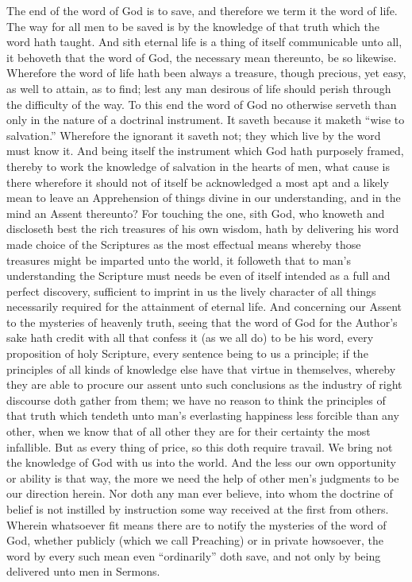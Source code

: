 The end of the word of God is to save, and therefore we term it the word of life. The way for all men to be saved is by the knowledge of that truth which the word hath taught. And sith eternal life is a thing of itself communicable unto all, it behoveth that the word of God, the necessary mean thereunto, be so likewise. Wherefore the word of life hath been always a treasure, though precious, yet easy, as well to attain, as to find; lest any man desirous of life should perish through the difficulty of the way. To this end the word of God no otherwise serveth than only in the nature of a doctrinal instrument. It saveth because it maketh “wise to salvation.” Wherefore the ignorant it saveth not; they which live by the word must know it. And being itself the instrument which God hath purposely framed, thereby to work the knowledge of salvation in the hearts of men, what cause is there wherefore it should not of itself be acknowledged a most apt and a likely mean to leave an Apprehension of things divine in our understanding, and in the mind an Assent thereunto? For touching the one, sith God, who knoweth and discloseth best the rich treasures of his own wisdom, hath by delivering his word made choice of the Scriptures as the most effectual means whereby those treasures might be imparted unto the world, it followeth that to man’s understanding the Scripture must needs be even of itself intended as a full and perfect discovery, sufficient to imprint in us the lively character of all things necessarily required for the attainment of eternal life. And concerning our Assent to the mysteries of heavenly truth,  seeing that the word of God for the Author’s sake hath credit with all that confess it (as we all do) to be his word, every proposition of holy Scripture, every sentence being to us a principle; if the principles of all kinds of knowledge else have that virtue in themselves, whereby they are able to procure our assent unto such conclusions as the industry of right discourse doth gather from them; we have no reason to think the principles of that truth which tendeth unto man’s everlasting happiness less forcible than any other, when we know that of all other they are for their certainty the most infallible.
But as every thing of price, so this doth require travail. We bring not the knowledge of God with us into the world. And the less our own opportunity or ability is that way, the more we need the help of other men’s judgments to be our direction herein. Nor doth any man ever believe, into whom the doctrine of belief is not instilled by instruction some way received at the first from others. Wherein whatsoever fit means there are to notify the mysteries of the word of God, whether publicly (which we call Preaching) or in private howsoever, the word by every such mean even “ordinarily” doth save, and not only by being delivered unto men in Sermons.
